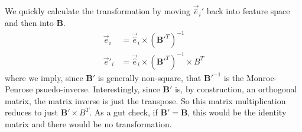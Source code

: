 \documentclass{article}
\begin{document}
We quickly calculate the transformation by moving $\vec{\hat{e}}_i'$ back into feature space and then into $\mathbf{B}$. 
\begin{equation}
\begin{aligned}
    \vec{e}_i &= \vec{\hat{e}}_i\times \left(\mathbf{B}'^T\right)^{-1}\\
    \vec{e}'_i & = \vec{\hat{e}}_i \times \left(\mathbf{B}'^T\right)^{-1} \times B^T
\end{aligned}
\end{equation}
where we imply, since $\mathbf{B}'$ is generally non-square, that $\mathbf{B}'^{-1}$ is the Monroe-Penrose psuedo-inverse. Interestingly, since $\mathbf{B}'$ is, by construction, an orthogonal matrix, the matrix inverse is just the transpose. So this matrix multiplication reduces to just $\mathbf{B}' \times B^T$. As a gut check, if $\mathbf{B}'=\mathbf{B}$, this would be the identity matrix and there would be no transformation. 
\end{document}
